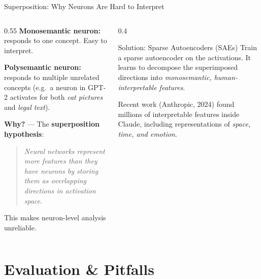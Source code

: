 \documentclass[aspectratio=169]{beamer}
\begin{document}
\begin{frame}{Superposition: Why Neurons Are Hard to Interpret}
  \begin{columns}[T]
    \begin{column}{0.55\textwidth}
      \textbf{Monosemantic neuron:} responds to one concept.
      Easy to interpret.

      \vspace{0.5em}
      \textbf{Polysemantic neuron:} responds to multiple unrelated concepts
      (e.g.\ a neuron in GPT-2 activates for both \emph{cat pictures}
      and \emph{legal text}).

      \vspace{0.5em}
      \textbf{Why?} — The \textbf{superposition hypothesis}:
      \begin{quote}
        \itshape Neural networks represent more features than they have
        neurons by storing them as overlapping directions in activation space.
      \end{quote}

      This makes neuron-level analysis unreliable.
    \end{column}
    \begin{column}{0.4\textwidth}
      \begin{block}{Solution: Sparse Autoencoders (SAEs)}
        Train a sparse autoencoder on the activations.
        It learns to decompose the superimposed directions into
        \emph{monosemantic, human-interpretable features}.

        \vspace{0.3em}
        Recent work (Anthropic, 2024) found millions of interpretable
        features inside Claude, including representations of
        \emph{space, time, and emotion}.
      \end{block}
    \end{column}
  \end{columns}
\end{frame}

\section{Evaluation \& Pitfalls}
\end{document}
